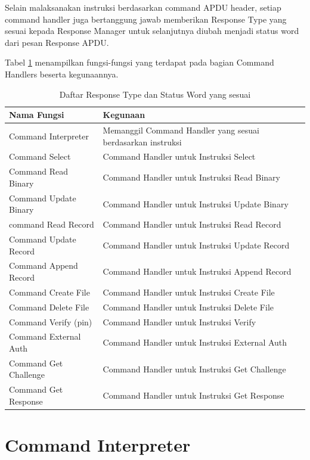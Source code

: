 Selain malaksanakan instruksi berdasarkan command APDU header, setiap command handler juga bertanggung jawab memberikan Response Type yang sesuai kepada Response Manager untuk selanjutnya diubah menjadi status word dari pesan Response APDU.

Tabel \ref{tabel-cmdfunc} menampilkan fungsi-fungsi yang terdapat pada bagian Command Handlers beserta kegunaannya.

\begin{table}[h]
  \centering
  \begin{tabular}{|m{5cm}|m{8cm}|}
    \hline
    \bf{Nama Fungsi} & \bf{Kegunaan} \\
    \hline
    Command Interpreter & Memanggil Command Handler yang sesuai berdasarkan instruksi \\
    \hline
    Command Select & Command Handler untuk Instruksi Select \\
    \hline
    Command Read Binary & Command Handler untuk Instruksi Read Binary \\
    \hline
    Command Update Binary & Command Handler untuk Instruksi Update Binary \\
    \hline
    command Read Record & Command Handler untuk Instruksi Read Record \\
    \hline
    Command Update Record & Command Handler untuk Instruksi Update Record \\
    \hline
    Command Append Record & Command Handler untuk Instruksi Append Record \\
    \hline
    Command Create File & Command Handler untuk Instruksi Create File \\
    \hline
    Command Delete File & Command Handler untuk Instruksi Delete File \\
    \hline
    Command Verify (pin) & Command Handler untuk Instruksi Verify \\
    \hline
    Command External Auth & Command Handler untuk Instruksi External Auth \\
    \hline
    Command Get Challenge & Command Handler untuk Instruksi Get Challenge \\
    \hline
    Command Get Response & Command Handler untuk Instruksi Get Response \\
    \hline
  \end{tabular}
  \caption{Daftar Response Type dan Status Word yang sesuai}
  \label{tabel-cmdfunc}
\end{table}

\section{Command Interpreter}
\label{sec_cmdinterpreter}

